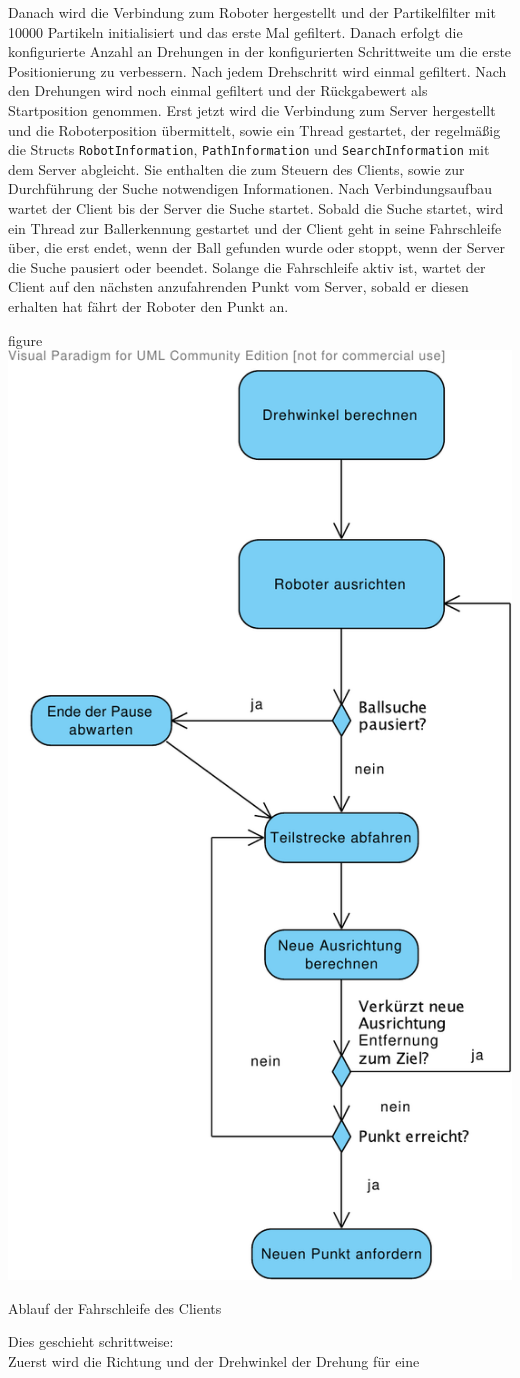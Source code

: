 Danach wird die Verbindung zum Roboter hergestellt und der Partikelfilter
mit 10000 Partikeln initialisiert und das erste Mal gefiltert. Danach
erfolgt die konfigurierte Anzahl an Drehungen in der konfigurierten
Schrittweite um die erste Positionierung zu verbessern. Nach jedem
Drehschritt wird einmal gefiltert. Nach den Drehungen wird noch einmal
gefiltert und der Rückgabewert als Startposition genommen. Erst jetzt wird
die Verbindung zum Server hergestellt und die Roboterposition übermittelt,
sowie ein Thread gestartet, der regelmäßig die Structs \lstinline|RobotInformation|,
\lstinline|PathInformation| und \lstinline|SearchInformation| mit dem
Server abgleicht.  Sie enthalten die zum Steuern des Clients, sowie zur
Durchführung der Suche notwendigen Informationen.  Nach
Verbindungsaufbau wartet der Client bis der Server die Suche startet. 
Sobald die Suche startet, wird ein  Thread zur
Ballerkennung gestartet und der Client geht in seine Fahrschleife über, die
 erst endet, wenn der Ball gefunden wurde oder stoppt, wenn der Server
 die Suche pausiert oder beendet. Solange die Fahrschleife aktiv ist,
 wartet der Client auf den nächsten anzufahrenden Punkt vom Server,
sobald er diesen erhalten hat fährt der Roboter den Punkt an.
\begin{nofloat}{figure}
  \centering
  \includegraphics[width=0.45\linewidth]{bilder/fahrschleife_uml}
\caption{Ablauf der Fahrschleife des Clients}
\end{nofloat}
Dies geschieht schrittweise:\\
Zuerst wird die Richtung und der Drehwinkel der Drehung für eine
